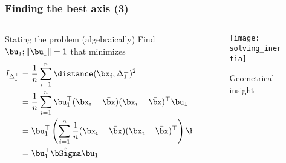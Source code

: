 \begin{frame}
  \frametitle{Finding the best axis (3)}

\begin{columns}
  \begin{column}{.5\textwidth}
  \begin{block}{Stating the problem (algebraically)}
    Find $\bu_1; \|\bu_1 \|=1$ that minimizes
    \begin{equation*}
      \begin{aligned}
        I_{\Delta_1^\bot} & = \frac{1}{n}\sum_{i=1}^n \distance(\bx_i,\Delta_1^\bot)^2 \\ 
        & = \frac{1}{n}\sum_{i=1}^n \bu_1^\top (\bx_i - \bar{\bx})(\bx_i - \bar{\bx})^\top \bu_1 \\
        & = \bu_1^\top \left( \sum_{i=1}^n \frac{1}{n}(\bx_i - \bar{\bx})(\bx_i - \bar{\bx})^\top \right)  \bu_1 \\
        & = \bu_1^\top \hat{\bSigma}  \bu_1
      \end{aligned}
    \end{equation*} 
  \end{block}  
  \end{column}
  \begin{column}{.45\textwidth}
  \begin{figure}
    \texttt{[image: solving\_inertia]}
    \caption{Geometrical insight}
  \end{figure}
  \end{column}
\end{columns}
  
\end{frame}

